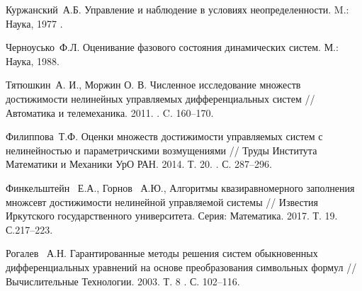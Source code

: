 \begin{thebibliography}{9} %




 Куржанский~А.Б. Управление и наблюдение в условиях неопределенности. M.:~ Наука, 1977 .

Черноусько~Ф.Л. Оценивание фазового состояния динамических систем. М.:~ Наука, 1988.

 Тятюшкин~А. И.,  Моржин О. В.  Численное исследование множеств достижимости нелинейных управляемых дифференциальных систем // Автоматика и телемеханика. 2011. . C. 160--170.

Филиппова~Т.Ф. Оценки множеств достижимости управляемых систем с нелинейностью и параметричскими возмущениями // Труды Института Математики и Механики УрО РАН. 2014. Т. 20. . С. 287--296.

 Финкельштейн~ Е.А., Горнов~ А.Ю., Алгоритмы квазиравномерного заполнения множсевт достижимости нелинейной управляемой системы // Известия Иркутского государственного университета. Серия: Математика. 2017. Т. 19. С.217--223.

 Рогалев~ А.Н. Гарантированные методы решения систем обыкновенных дифференциальных уравнений на основе преобразования символьных формул // Вычислительные Технологии. 2003. Т. 8 . С. 102--116.



\end{thebibliography}

